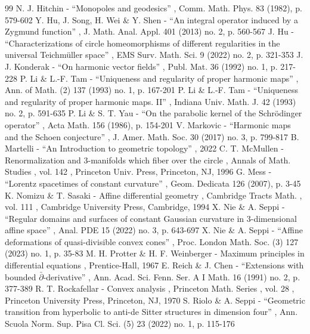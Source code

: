 \documentclass[11pt]{article}
\theoremstyle{plain}
\theoremstyle{definition}
\begin{document}
\begin{thebibliography}{99}
 N. J. Hitchin - “Monopoles and geodesics” , Comm. Math. Phys. 83 (1982), p. 579-602
 Y. Hu, J. Song, H. Wei \& Y. Shen - “An integral operator induced by a Zygmund function” , J. Math. Anal. Appl. 401 (2013) no. 2, p. 560-567
 J. Hu - “Characterizations of circle homeomorphisms of different regularities in the universal Teichmüller space” , EMS Surv. Math. Sci. 9 (2022) no. 2, p. 321-353
 J. J. Konderak - “On harmonic vector fields” , Publ. Mat. 36 (1992) no. 1, p. 217-228
 P. Li \& L.-F. Tam - “Uniqueness and regularity of proper harmonic maps” , Ann. of Math. (2) 137 (1993) no. 1, p. 167-201
 P. Li \& L.-F. Tam - “Uniqueness and regularity of proper harmonic maps. II” , Indiana Univ. Math. J. 42 (1993) no. 2, p. 591-635
 P. Li \& S. T. Yau - “On the parabolic kernel of the Schrödinger operator” , Acta Math. 156 (1986), p. 154-201
 V. Markovic - “Harmonic maps and the Schoen conjecture” , J. Amer. Math. Soc. 30 (2017) no. 3, p. 799-817
 B. Martelli - “An Introduction to geometric topology” , 2022
 C. T. McMullen - Renormalization and $3$-manifolds which fiber over the circle , Annals of Math. Studies , vol. 142 , Princeton Univ. Press, Princeton, NJ, 1996
 G. Mess - “Lorentz spacetimes of constant curvature” , Geom. Dedicata 126 (2007), p. 3-45
 K. Nomizu \& T. Sasaki - Affine differential geometry , Cambridge Tracts Math. , vol. 111 , Cambridge University Press, Cambridge, 1994
 X. Nie \& A. Seppi - “Regular domains and surfaces of constant Gaussian curvature in $3$-dimensional affine space” , Anal. PDE 15 (2022) no. 3, p. 643-697
 X. Nie \& A. Seppi - “Affine deformations of quasi-divisible convex cones” , Proc. London Math. Soc. (3) 127 (2023) no. 1, p. 35-83
 M. H. Protter \& H. F. Weinberger - Maximum principles in differential equations , Prentice-Hall, 1967
 E. Reich \& J. Chen - “Extensions with bounded $\bar{\partial }$-derivative” , Ann. Acad. Sci. Fenn. Ser. A I Math. 16 (1991) no. 2, p. 377-389
 R. T. Rockafellar - Convex analysis , Princeton Math. Series , vol. 28 , Princeton University Press, Princeton, NJ, 1970
 S. Riolo \& A. Seppi - “Geometric transition from hyperbolic to anti-de Sitter structures in dimension four” , Ann. Scuola Norm. Sup. Pisa Cl. Sci. (5) 23 (2022) no. 1, p. 115-176

\end{thebibliography}
\end{document}
